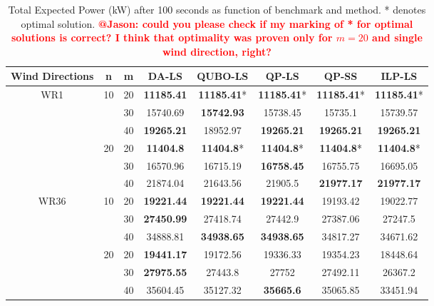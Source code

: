 \documentclass[preprint,12pt]{elsarticle}
\newcommand{\todo}[1]{{\textcolor{red}{\bf {#1}}}}
\begin{document}
\begin{table}[t!]
	
	\begin{tabular}{| c | c | c | c | c | c | c | c |}
		\toprule
		Wind Directions  & n  & m  & DA-LS  & QUBO-LS  & QP-LS  & QP-SS  & ILP-LS  \\
		\toprule
		\multirow{6}{*}{WR1}  & \multirow{3}{*}{10}       & 20       & \textbf{11185.41} & \textbf{11185.41}* & \textbf{11185.41}* & \textbf{11185.41}* & \textbf{11185.41}* \\
		& & 30   & 15740.69 & \textbf{15742.93}  & 15738.45  & 15735.1  & 15739.57     \\
		& & 40 & \textbf{19265.21} & 18952.97 & \textbf{19265.21}  & \textbf{19265.21} & \textbf{19265.21}                \\
		\cline{2-8}
		&\multirow{3}{*}{20}   & 20       & \textbf{11404.8}  & \textbf{11404.8}*  & \textbf{11404.8}*  & \textbf{11404.8}*  & \textbf{11404.8}*           \\
		&&30   & 16570.96 & 16715.19  & \textbf{16758.45}  & 16755.75 & 16695.05                  \\
		&&40   & 21874.04 & 21643.56  & 21905.5 & \textbf{21977.17} & \textbf{21977.17}        \\
		\hline
		\multirow{6}{*}{WR36} &  \multirow{3}{*}{10}    & 20       & \textbf{19221.44} & \textbf{19221.44} & \textbf{19221.44} & 19193.42 & 19022.77 \\
		&& 30  & \textbf{27450.99} & 27418.74 & 27442.9 & 27387.06 & 27247.5                     \\
		&&40   & 34888.81 & \textbf{34938.65} & \textbf{34938.65} & 34817.27  & 34671.62          \\
		\cline{2-8}
		&  \multirow{3}{*}{20}   & 20   & \textbf{19441.17}  & 19172.56 & 19336.33 & 19354.23  & 18448.64            \\
		&&30   & \textbf{27975.55} & 27443.8  & 27752 & 27492.11  & 26367.2                      \\
		&&40   & 35604.45 & 35127.32 & \textbf{35665.6}   & 35065.85 & 33451.94 \\
		\bottomrule                   
	\end{tabular}
	
	\vspace{0.5em}
	\caption{Total Expected Power (kW) after 100 seconds as function of benchmark and method. * denotes optimal solution. \todo{@Jason: could you please check if my marking of * for optimal solutions is correct? I think that optimality was proven only for $m=20$ and single wind direction, right?} }\label{tab:results1}
\end{table}
\end{document}
